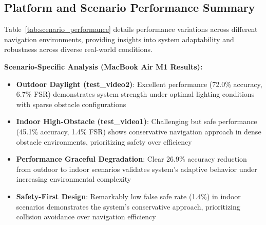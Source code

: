 \documentclass[12pt,oneside]{book}
\newcommand{\tabref}[1]{Table~\ref{#1}}
\begin{document}
\subsection{Platform and Scenario Performance Summary}

\tabref{tab:scenario_performance} details performance variations across different navigation environments, providing insights into system adaptability and robustness across diverse real-world conditions.

\begin{table}[ht]
\centering
\caption{Performance Analysis Across Navigation Scenarios}
\label{tab:scenario_performance}
\end{table}

\textbf{Scenario-Specific Analysis (MacBook Air M1 Results):}
\begin{itemize}
\item \textbf{Outdoor Daylight (test\_video2)}: Excellent performance (72.0\% accuracy, 6.7\% FSR) demonstrates system strength under optimal lighting conditions with sparse obstacle configurations
\item \textbf{Indoor High-Obstacle (test\_video1)}: Challenging but safe performance (45.1\% accuracy, 1.4\% FSR) shows conservative navigation approach in dense obstacle environments, prioritizing safety over efficiency
\item \textbf{Performance Graceful Degradation}: Clear 26.9\% accuracy reduction from outdoor to indoor scenarios validates system's adaptive behavior under increasing environmental complexity
\item \textbf{Safety-First Design}: Remarkably low false safe rate (1.4\%) in indoor scenarios demonstrates the system's conservative approach, prioritizing collision avoidance over navigation efficiency
\end{itemize}
\end{document}
